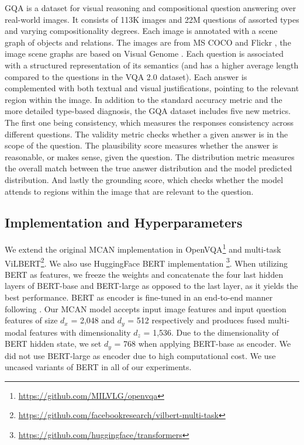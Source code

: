\documentclass{article}
\begin{document}
GQA is a dataset \cite{hudson2019gqa} for visual reasoning and compositional question answering over real-world images. It consists of 113K images and 22M questions of assorted types and varying compositionality degrees. Each image is annotated with a scene graph of objects and relations. The images are from MS COCO \citep{coco} and Flickr \citep{thomee2016flickr}, the image scene graphs are based on Visual Genome \citep{krishnavisualgenome}. Each question is associated with a structured representation of its semantics (and has a higher average length compared to the questions in the VQA 2.0 dataset). Each answer is complemented with both textual and visual justifications, pointing to the relevant region within the image. In addition to the standard accuracy metric and the more detailed type-based diagnosis, the GQA dataset includes five new metrics. The first one being consistency, which measures the responses consistency across different questions. The validity metric checks whether a given answer is in the scope of the question. The plausibility score measures whether the answer is reasonable, or makes sense, given the question. The distribution metric measures the overall match between the true answer distribution and the model predicted distribution. And lastly the grounding score, which checks whether the model attends to regions within the image that are relevant to the question.

\subsection{Implementation and Hyperparameters}
We extend the original MCAN implementation in OpenVQA\footnote{\url{https://github.com/MILVLG/openvqa}} and multi-task ViLBERT\footnote{\url{https://github.com/facebookresearch/vilbert-multi-task}}. We also use HuggingFace BERT implementation \citep{wolf2019huggingfaces}\footnote{\url{https://github.com/huggingface/transformers}}. When utilizing BERT as features, %
we freeze the weights and concatenate the four last hidden layers of BERT-base and BERT-large as opposed to the last layer, as it yields the best performance. BERT as encoder is fine-tuned in an end-to-end manner following \citep{devlin-etal-2019-bert}. Our MCAN model accepts input image features and input question features of size $d_{x}$ = 2,048 and $d_{y}$ = 512 respectively and produces fused multi-modal features with dimensionality $d_{z}$ = 1,536. Due to the dimensionality of BERT hidden state, we set $d_{y}$ = 768 when applying BERT-base as encoder. We did not use BERT-large as encoder due to high computational cost. We use uncased variants of BERT in all of our experiments.
\end{document}
